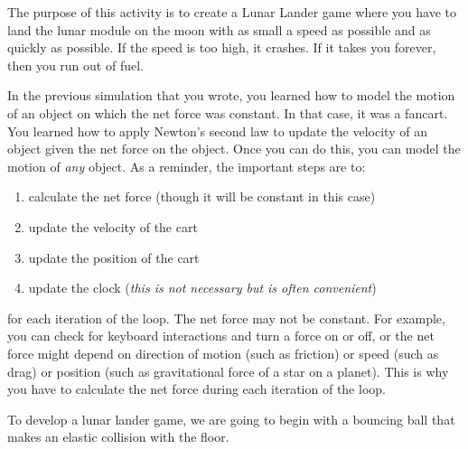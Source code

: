 
\apparatus
{}

\longgoal

The purpose of this activity is to create a Lunar Lander game where you have to land the lunar module on the moon with as small a speed as possible and as quickly as possible. If the speed is too high, it crashes. If it takes you forever, then you run out of fuel.

\procedure

In the previous simulation that you wrote, you learned how to model the motion of an object on which the net force was constant. In that case, it was a fancart. You learned how to apply Newton's second law to update the velocity of an object given the net force on the object. Once you can do this, you can model the motion of \emph{any} object. As a reminder, the important steps are to:

	\begin{enumerate}
		\item calculate the net force (though it will be constant in this case)
		\item update the velocity of the cart
		\item update the position of the cart
		\item update the clock (\emph{this is not necessary but is often convenient})
	\end{enumerate}
	
for each iteration of the loop. The net force may not be constant. For example, you can check for keyboard interactions and turn a force on or off, or the net force might depend on direction of motion (such as friction) or speed (such as drag) or position (such as gravitational force of a star on a planet). This is why you have to calculate the net force during each iteration of the loop.

To develop a lunar lander game, we are going to begin with a bouncing ball that makes an elastic collision with the floor. 

